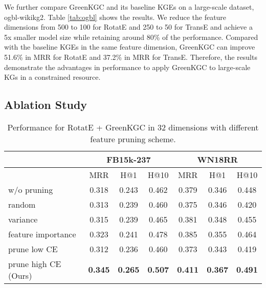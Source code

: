 \documentclass{article}
\begin{document}
{\color{black}We further compare GreenKGC and its baseline KGEs on a large-scale 
dataset, ogbl-wikikg2. Table \ref{tab:ogbl} shows the results. We reduce the feature 
dimensions from 500 to 100 for RotatE and 250 to 50 for TransE and achieve a 5x smaller
model size while retaining around 80\% of the performance. Compared with the baseline 
KGEs in the same feature dimension, GreenKGC can improve 51.6\% in MRR for RotatE and 
37.2\% in MRR for TransE. Therefore, the results demonstrate the advantages in performance
to apply GreenKGC to large-scale KGs in a constrained resource.}

\subsection{Ablation Study} \label{sec:ablation} 

\begin{table}[t]
\setlength\tabcolsep{3pt}
\centering
{\color{black}
\begin{tabular}{l | c  c  c | c  c  c}
\hline
& \multicolumn{3}{c|}{\textbf{FB15k-237}} & \multicolumn{3}{c}{\textbf{WN18RR}} \\
\hline
& MRR & H@1 & H@10 & MRR & H@1 & H@10\\
\hline
w/o pruning   & 0.318 & 0.243 & 0.462 & 0.379 & 0.346 & 0.448 \\
\hline
random             & 0.313 & 0.239 & 0.460 & 0.375 & 0.346 & 0.420 \\
variance           & 0.315 & 0.239 & 0.465 & 0.381 & 0.348 & 0.455 \\
feature importance & 0.323 & 0.241 & 0.478 & 0.385 & 0.355 & 0.464 \\
\hline
prune low CE             & 0.312 & 0.236 & 0.460 & 0.373 & 0.343 & 0.419 \\
prune high CE (Ours)     & {\bf 0.345} & {\bf 0.265} & {\bf 0.507} & 
               {\bf 0.411} & {\bf 0.367} & {\bf 0.491} \\
\hline
\end{tabular}
}
\caption{Performance for RotatE + GreenKGC in 32
dimensions with different feature pruning scheme.}\label{tab:prune}
\end{table}
\end{document}
